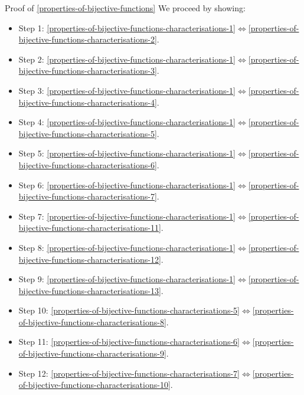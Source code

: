 \begin{Proof}{Proof of \cref{properties-of-bijective-functions}}%
    We proceed by showing:
    \begin{itemize}
        \item Step 1: \cref{properties-of-bijective-functions-characterisations-1}$\iff$\cref{properties-of-bijective-functions-characterisations-2}.
        \item Step 2: \cref{properties-of-bijective-functions-characterisations-1}$\iff$\cref{properties-of-bijective-functions-characterisations-3}.
        \item Step 3: \cref{properties-of-bijective-functions-characterisations-1}$\iff$\cref{properties-of-bijective-functions-characterisations-4}.
        \item Step 4: \cref{properties-of-bijective-functions-characterisations-1}$\iff$\cref{properties-of-bijective-functions-characterisations-5}.
        \item Step 5: \cref{properties-of-bijective-functions-characterisations-1}$\iff$\cref{properties-of-bijective-functions-characterisations-6}.
        \item Step 6: \cref{properties-of-bijective-functions-characterisations-1}$\iff$\cref{properties-of-bijective-functions-characterisations-7}.
        \item Step 7: \cref{properties-of-bijective-functions-characterisations-1}$\iff$\cref{properties-of-bijective-functions-characterisations-11}.
        \item Step 8: \cref{properties-of-bijective-functions-characterisations-1}$\iff$\cref{properties-of-bijective-functions-characterisations-12}.
        \item Step 9: \cref{properties-of-bijective-functions-characterisations-1}$\iff$\cref{properties-of-bijective-functions-characterisations-13}.
        \item Step 10: \cref{properties-of-bijective-functions-characterisations-5}$\iff$\cref{properties-of-bijective-functions-characterisations-8}.
        \item Step 11: \cref{properties-of-bijective-functions-characterisations-6}$\iff$\cref{properties-of-bijective-functions-characterisations-9}.
        \item Step 12: \cref{properties-of-bijective-functions-characterisations-7}$\iff$\cref{properties-of-bijective-functions-characterisations-10}.
    \end{itemize}


\end{Proof}

